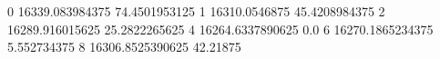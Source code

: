 0 16339.083984375 74.4501953125
1 16310.0546875 45.4208984375
2 16289.916015625 25.2822265625
4 16264.6337890625 0.0
6 16270.1865234375 5.552734375
8 16306.8525390625 42.21875
